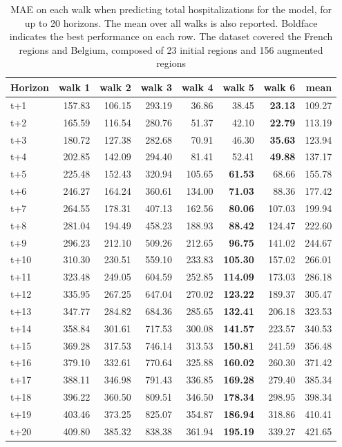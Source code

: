\begin{table}[H]
\centering
\caption{MAE on each walk when predicting total hospitalizations for the model, for up to 20 horizons. The mean over all walks is also reported. Boldface indicates the best performance on each row. The dataset covered the French regions and Belgium, composed of 23 initial regions and 156 augmented regions }
\label{tab:MAE_walk_encoder_decoder}
\begin{tabular}{lrrrrrrr}
\toprule
Horizon &  walk 1 &  walk 2 &  walk 3 &  walk 4 &  walk 5 &  walk 6 &   mean \\
\midrule
t+1  & 157.83  & 106.15  & 293.19  & 36.86  & 38.45  & \textbf{23.13}  & 109.27  \\
t+2  & 165.59  & 116.54  & 280.76  & 51.37  & 42.10  & \textbf{22.79}  & 113.19  \\
t+3  & 180.72  & 127.38  & 282.68  & 70.91  & 46.30  & \textbf{35.63}  & 123.94  \\
t+4  & 202.85  & 142.09  & 294.40  & 81.41  & 52.41  & \textbf{49.88}  & 137.17  \\
t+5  & 225.48  & 152.43  & 320.94  & 105.65  & \textbf{61.53}  & 68.66  & 155.78  \\
t+6  & 246.27  & 164.24  & 360.61  & 134.00  & \textbf{71.03}  & 88.36  & 177.42  \\
t+7  & 264.55  & 178.31  & 407.13  & 162.56  & \textbf{80.06}  & 107.03  & 199.94  \\
t+8  & 281.04  & 194.49  & 458.23  & 188.93  & \textbf{88.42}  & 124.47  & 222.60  \\
t+9  & 296.23  & 212.10  & 509.26  & 212.65  & \textbf{96.75}  & 141.02  & 244.67  \\
t+10  & 310.30  & 230.51  & 559.10  & 233.83  & \textbf{105.30}  & 157.02  & 266.01  \\
t+11  & 323.48  & 249.05  & 604.59  & 252.85  & \textbf{114.09}  & 173.03  & 286.18  \\
t+12  & 335.95  & 267.25  & 647.04  & 270.02  & \textbf{123.22}  & 189.37  & 305.47  \\
t+13  & 347.77  & 284.82  & 684.36  & 285.65  & \textbf{132.41}  & 206.18  & 323.53  \\
t+14  & 358.84  & 301.61  & 717.53  & 300.08  & \textbf{141.57}  & 223.57  & 340.53  \\
t+15  & 369.28  & 317.53  & 746.14  & 313.53  & \textbf{150.81}  & 241.59  & 356.48  \\
t+16  & 379.10  & 332.61  & 770.64  & 325.88  & \textbf{160.02}  & 260.30  & 371.42  \\
t+17  & 388.11  & 346.98  & 791.43  & 336.85  & \textbf{169.28}  & 279.40  & 385.34  \\
t+18  & 396.22  & 360.50  & 809.51  & 346.50  & \textbf{178.34}  & 298.95  & 398.34  \\
t+19  & 403.46  & 373.25  & 825.07  & 354.87  & \textbf{186.94}  & 318.86  & 410.41  \\
t+20  & 409.80  & 385.32  & 838.38  & 361.94  & \textbf{195.19}  & 339.27  & 421.65  \\

\bottomrule
\end{tabular}
\end{table}
